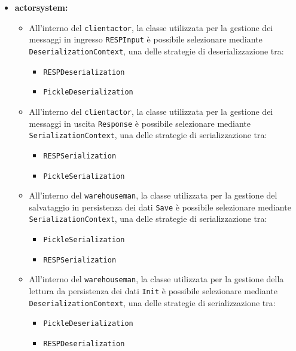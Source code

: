 \documentclass{scalatekids-article}
\begin{document}
\begin{itemize}
\begin{itemize}
  \item \textbf{actorsystem:}
    \begin{itemize}
    \item All'interno del  \verb=clientactor=, la classe utilizzata per la
      gestione dei messaggi in ingresso \verb=RESPInput= è possibile selezionare
      mediante \verb=DeserializationContext=, una delle strategie di deserializzazione
      tra:
      \begin{itemize}
      \item \verb=RESPDeserialization=
      \item \verb=PickleDeserialization=
      \end{itemize}
    \item All'interno del  \verb=clientactor=, la classe utilizzata per la
      gestione dei messaggi in uscita \verb=Response= è possibile selezionare
      mediante \verb=SerializationContext=, una delle strategie di serializzazione
      tra:
      \begin{itemize}
      \item \verb=RESPSerialization=
      \item \verb=PickleSerialization=
      \end{itemize}
    \item All'interno del  \verb=warehouseman=, la classe utilizzata per
      la gestione del salvataggio in persistenza dei dati \verb=Save= è
      possibile selezionare mediante \verb=SerializationContext=, una delle
      strategie di serializzazione tra:
      \begin{itemize}
      \item \verb=PickleSerialization=
      \item \verb=RESPSerialization=
      \end{itemize}
    \item All'interno del  \verb=warehouseman=, la classe utilizzata per
      la gestione della lettura da persistenza dei dati \verb=Init= è
      possibile selezionare mediante \verb=DeserializationContext=, una delle
      strategie di serializzazione tra:
      \begin{itemize}
      \item \verb=PickleDeserialization=
      \item \verb=RESPDeserialization=
      \end{itemize}
    \end{itemize}

  \end{itemize}

\end{itemize}
\end{document}
